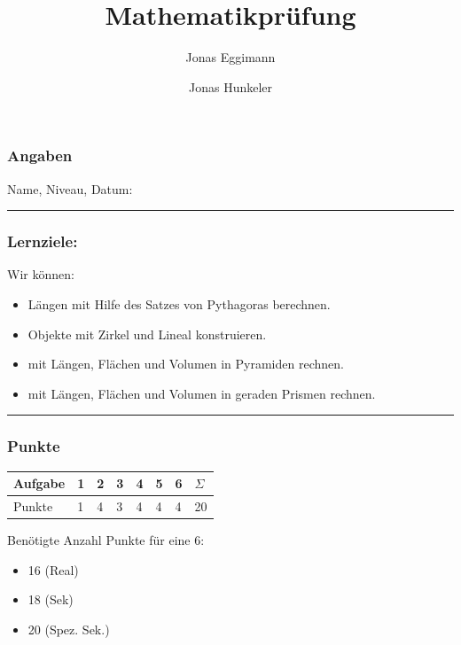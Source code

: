 \documentclass[
  letterpaper,
  DIV=11]{scrartcl}
\title{Mathematikprüfung}
\author{Jonas Eggimann \and Jonas Hunkeler}
\date{}
\providecommand{\tightlist}{%
  \setlength{\itemsep}{0pt}\setlength{\parskip}{0pt}}\usepackage{longtable,booktabs,array}
\begin{document}
\maketitle

\subsubsection{Angaben}\label{angaben}

Name, Niveau, Datum:

\begin{center}\rule{0.5\linewidth}{0.5pt}\end{center}

\subsubsection{Lernziele:}\label{lernziele}

Wir können:

\begin{itemize}
\tightlist
\item
  Längen mit Hilfe des Satzes von Pythagoras berechnen.
\item
  Objekte mit Zirkel und Lineal konstruieren.
\item
  mit Längen, Flächen und Volumen in Pyramiden rechnen.
\item
  mit Längen, Flächen und Volumen in geraden Prismen rechnen.
\end{itemize}

\begin{center}\rule{0.5\linewidth}{0.5pt}\end{center}

\subsubsection{Punkte}\label{punkte}

\begin{longtable}[]{@{}llllllll@{}}
\toprule\noalign{}
Aufgabe & 1 & 2 & 3 & 4 & 5 & 6 & \(\Sigma\) \\
\midrule\noalign{}
\endhead
\bottomrule\noalign{}
\endlastfoot
Punkte & 1 & 4 & 3 & 4 & 4 & 4 & 20 \\
\end{longtable}

Benötigte Anzahl Punkte für eine 6:

\begin{itemize}
\tightlist
\item
  16 (Real)
\item
  18 (Sek)
\item
  20 (Spez. Sek.)
\end{itemize}
\end{document}
